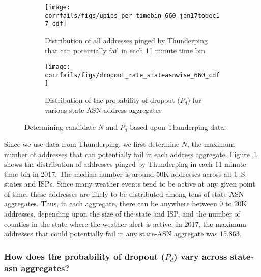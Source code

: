 
\begin{figure*}[t]
  \begin{subfigure}[t]{0.47\linewidth}
    \centering
    \texttt{[image: corrfails/figs/upips\_per\_timebin\_660\_jan17todec17\_cdf]} 
    \caption{
      \label{fig:upips_per_timebin}
      Distribution of all addresses pinged by Thunderping that can potentially fail in each 11 minute
      time bin
    }
  \end{subfigure}
  \hfill
  \begin{subfigure}[t]{0.47\linewidth}
    \centering
   \texttt{[image: corrfails/figs/dropout\_rate\_stateasnwise\_660\_cdf]} 
 \caption{
   \label{fig:p_dropout}
   Distribution of the probability of dropout ($P_d$) for various state-ASN address aggregates
 }
\end{subfigure}
\caption{Determining candidate $N$ and $P_d$ based upon Thunderping data.
  \label{fig:binomial_params}
}
\end{figure*}


Since we use data from Thunderping, we first determine $N$, the
maximum number
of addresses that can potentially fail in each address
aggregate. Figure~\ref{fig:upips_per_timebin} shows the distribution
of addresses pinged by Thunderping in each 11 minute time bin
in 2017. The
median number is around 50K addresses across all U.S. states and
ISPs. Since many weather events tend to be active at any given point of time,
these addresses are likely to be distributed among tens of state-ASN
aggregates. Thus, in each aggregate, there can be anywhere between 0
to 20K addresses, depending upon the size of the state and ISP, and
the number of counties in the state where the weather alert is
active. In 2017, the maximum addresses that could potentially fail in
any state-ASN aggregate was 15,863. 

\subsubsection*{How does the probability of dropout ($P_d$) vary across
  state-asn aggregates?}

